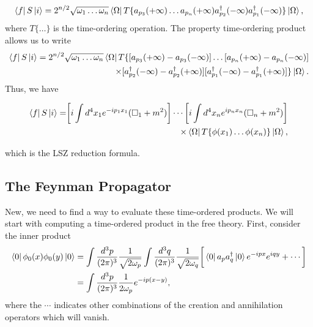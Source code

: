 \documentclass[11pt]{article}
\theoremstyle{definition}
\begin{document}
\begin{equation}
    \bra{f}S\ket{i} = 2^{n/2} \sqrt{\omega_1 \dots \omega_n}\bra{\Omega}T\{a_{p_3}(+\infty) \dots a_{p_n}(+\infty)a_{p_2}^\dagger(-\infty) a_{p_1}^\dagger(-\infty) \}\ket{\Omega},
\end{equation}
where $T\{ \dots \}$ is the time-ordering operation. The property time-ordering product allows us to write
\begin{equation}
\begin{aligned}
        \bra{f}S\ket{i} = 2^{n/2} \sqrt{\omega_1 \dots \omega_n}\bra{\Omega}T\{[a_{p_3}(+\infty) - a_{p_3}(-\infty)] \dots [a_{p_n}(+\infty) - a_{p_n}(-\infty)]\\
        \quad \times [a_{p_2}^\dagger(-\infty) - a_{p_2}^\dagger(+\infty)] [a_{p_1}^\dagger(-\infty) - a_{p_1}^\dagger(+\infty)] \}\ket{\Omega}.
\end{aligned}
\end{equation}
Thus, we have
\begin{shaded}
    \begin{equation}
    \begin{aligned}
                \bra{f}S\ket{i} = \biggr[ i\int d^4x_1e^{-ip_1x_1}(\square_1+m^2) \biggr] \cdots \biggr[ i\int d^4x_ne^{ip_nx_n}(\square_n+m^2) \biggr]\\
                \times \bra{\Omega}T\{\phi(x_1) \dots \phi(x_n)\}\ket{\Omega},
    \end{aligned}
    \end{equation}
\end{shaded}
which is the LSZ reduction formula.

\subsection{The Feynman Propagator}
New, we need to find a way to evaluate these time-ordered products. We will start with computing a time-ordered product in the free theory. First, consider the inner product
\begin{equation}
\begin{aligned}
        \bra{0}\phi_0(x)\phi_0(y)\ket{0} &= \int\frac{d^3p}{(2\pi)^3}\frac{1}{\sqrt{2\omega_p}} \int\frac{d^3q}{(2\pi)^3}\frac{1}{\sqrt{2\omega_q}} \biggr[ \bra{0}a_pa_q^\dagger\ket{0}e^{-ipx}e^{iqy} + \cdots \biggr] \\
        &= \int\frac{d^3p}{(2\pi)^3}\frac{1}{2\omega_p} e^{-ip(x-y)},
        \label{Eq. FP 1}
\end{aligned}
\end{equation}
where the $\cdots$ indicates other combinations of the creation and annihilation operators which will vanish.
\end{document}
